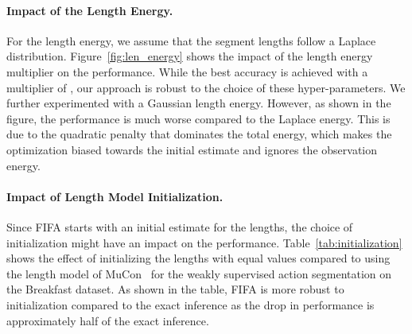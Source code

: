 \paragraph{Impact of the Length Energy.}
For the length energy, we assume that the segment lengths follow a Laplace distribution. Figure~\ref{fig:len_energy} shows the impact of the length energy multiplier on the performance. While the best accuracy is achieved with a multiplier of , our approach is robust to the choice of these hyper-parameters. We further experimented with a Gaussian length energy. However, as shown in the figure, the performance is much worse compared to the Laplace energy. This is due to the quadratic penalty that dominates the total energy, which makes the optimization biased towards the initial estimate and ignores the observation energy.  




\paragraph{Impact of Length Model Initialization.}
Since FIFA starts with an initial estimate for the lengths, the choice of initialization might have an impact on the performance. Table~\ref{tab:initialization} shows the effect of initializing the lengths with equal values compared to using the length model of MuCon~\cite{mucon} for the weakly supervised action segmentation on the Breakfast dataset. As shown in the table, FIFA is more robust to initialization compared to the exact inference as the drop in performance is approximately half of the exact inference.

\begin{table}[tb]
   \centering
   \caption{Impact of the Length Model initialization for MuCon using exact inference and FIFA for weakly supervised action segmentation on the Breakfast dataset.}
   \label{tab:initialization}
\end{table}


